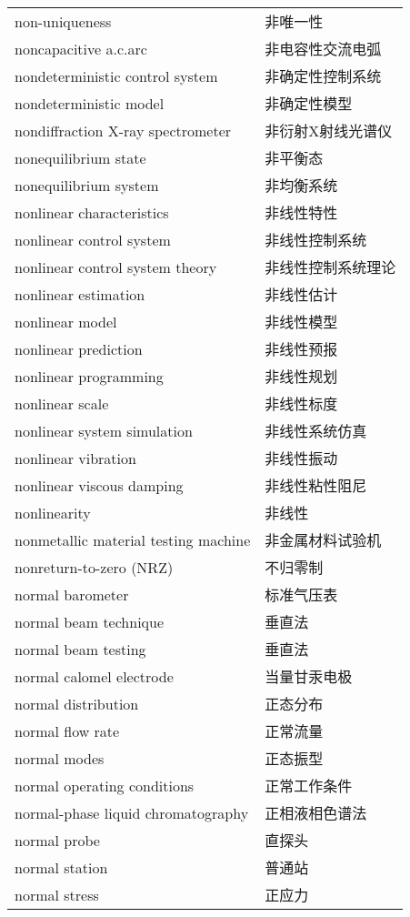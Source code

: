 \documentclass[
]{article}
\begin{document}
\begin{longtable}[]{@{}ll@{}}
non-uniqueness & 非唯一性 \\
noncapacitive a.c.arc & 非电容性交流电弧 \\
nondeterministic control system & 非确定性控制系统 \\
nondeterministic model & 非确定性模型 \\
nondiffraction X-ray spectrometer & 非衍射X射线光谱仪 \\
nonequilibrium state & 非平衡态 \\
nonequilibrium system & 非均衡系统 \\
nonlinear characteristics & 非线性特性 \\
nonlinear control system & 非线性控制系统 \\
nonlinear control system theory & 非线性控制系统理论 \\
nonlinear estimation & 非线性估计 \\
nonlinear model & 非线性模型 \\
nonlinear prediction & 非线性预报 \\
nonlinear programming & 非线性规划 \\
nonlinear scale & 非线性标度 \\
nonlinear system simulation & 非线性系统仿真 \\
nonlinear vibration & 非线性振动 \\
nonlinear viscous damping & 非线性粘性阻尼 \\
nonlinearity & 非线性 \\
nonmetallic material testing machine & 非金属材料试验机 \\
nonreturn-to-zero (NRZ) & 不归零制 \\
normal barometer & 标准气压表 \\
normal beam technique & 垂直法 \\
normal beam testing & 垂直法 \\
normal calomel electrode & 当量甘汞电极 \\
normal distribution & 正态分布 \\
normal flow rate & 正常流量 \\
normal modes & 正态振型 \\
normal operating conditions & 正常工作条件 \\
normal-phase liquid chromatography & 正相液相色谱法 \\
normal probe & 直探头 \\
normal station & 普通站 \\
normal stress & 正应力 \\

\end{longtable}
\end{document}
